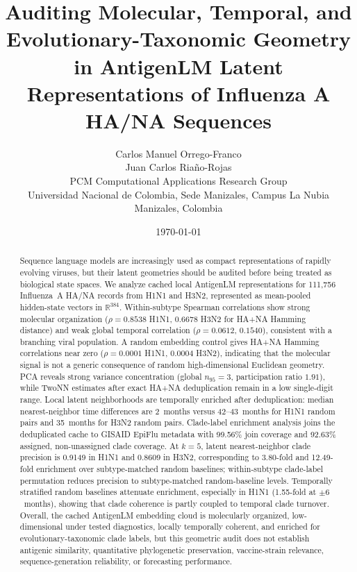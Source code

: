 \documentclass[11pt]{article}
\title{Auditing Molecular, Temporal, and Evolutionary-Taxonomic Geometry in AntigenLM Latent Representations of Influenza A HA/NA Sequences}
\author{
Carlos Manuel Orrego-Franco\\
Juan Carlos Riaño-Rojas\\
\vspace{0.4em}
\small PCM Computational Applications Research Group\\
\small Universidad Nacional de Colombia, Sede Manizales, Campus La Nubia\\
\small Manizales, Colombia
}
\date{\today}
\newcommand{\R}{\mathbb{R}}
\begin{document}
\maketitle

\begin{abstract}
Sequence language models are increasingly used as compact representations
of rapidly evolving viruses, but their latent geometries should be audited
before being treated as biological state spaces. We analyze cached local
AntigenLM representations for 111,756 Influenza~A HA/NA records from H1N1
and H3N2, represented as mean-pooled hidden-state vectors in $\R^{384}$.
Within-subtype Spearman correlations show strong molecular organization
($\rho = 0.8538$ H1N1, $0.6678$ H3N2 for HA+NA Hamming distance) and
weak global temporal correlation ($\rho = 0.0612$, $0.1540$), consistent
with a branching viral population. A random embedding control gives HA+NA
Hamming correlations near zero ($\rho = 0.0001$ H1N1, $0.0004$ H3N2),
indicating that the molecular signal is not a generic consequence of random
high-dimensional Euclidean geometry. PCA reveals strong variance concentration
(global $n_{95} = 3$, participation ratio $1.91$), while TwoNN estimates
after exact HA+NA deduplication remain in a low single-digit range.
Local latent neighborhoods are temporally enriched after deduplication:
median nearest-neighbor time differences are 2~months versus 42--43~months
for H1N1 random pairs and 35~months for H3N2 random pairs.
Clade-label enrichment analysis joins the deduplicated cache to GISAID
EpiFlu metadata with 99.56\% join coverage and 92.63\% assigned,
non-unassigned clade coverage. At $k = 5$, latent nearest-neighbor clade
precision is 0.9149 in H1N1 and 0.8609 in H3N2, corresponding to
3.80-fold and 12.49-fold enrichment over subtype-matched random baselines;
within-subtype clade-label permutation reduces precision to subtype-matched random-baseline
levels. Temporally stratified random baselines attenuate enrichment,
especially in H1N1 (1.55-fold at $\pm 6$~months), showing that clade
coherence is partly coupled to temporal clade turnover. Overall, the
cached AntigenLM embedding cloud is molecularly organized, low-dimensional
under tested diagnostics, locally temporally coherent, and enriched for
evolutionary-taxonomic clade labels, but this geometric audit does not
establish antigenic similarity, quantitative phylogenetic preservation,
vaccine-strain relevance, sequence-generation reliability, or forecasting
performance.
\end{abstract}
\end{document}
